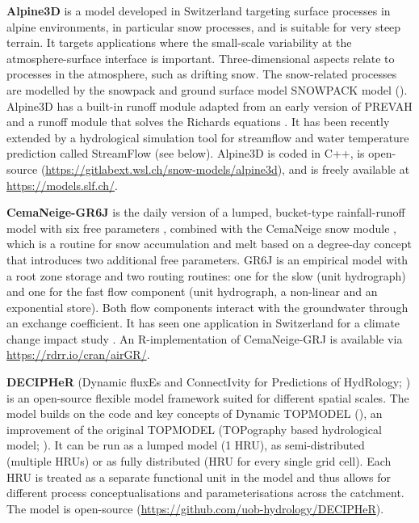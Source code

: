 \documentclass[10pt,a4paper]{article}
\begin{document}
\textbf{Alpine3D} \citep{Lehning2006} is a model developed in Switzerland targeting surface processes in alpine environments, in particular snow processes, and is suitable for very steep terrain. It targets applications where the small-scale variability at the atmosphere-surface interface is important. Three-dimensional aspects relate to processes in the atmosphere, such as drifting snow. The snow-related processes are modelled by the snowpack and ground surface model SNOWPACK model (\citealt{Bartelt2002, Lehning2002a, Lehning2002b}). Alpine3D has a built-in runoff module adapted from an early version of PREVAH \citep{Lehning2006} and a runoff module that solves the Richards equations \citep{Wever2017}. It has been recently extended by a hydrological simulation tool for streamflow and water temperature prediction called StreamFlow (see below). Alpine3D is coded in C++, is open-source (\url{https://gitlabext.wsl.ch/snow-models/alpine3d}), and is freely available at \url{https://models.slf.ch/}.

\textbf{CemaNeige-GR6J} is the daily version of a lumped, bucket-type rainfall-runoff model with six free parameters \citep{Pushpalatha2011}, combined with the CemaNeige snow module \citep{Valery2014a, Valery2014b}, which is a routine for snow accumulation and melt based on a degree-day concept that introduces two additional free parameters. GR6J is an empirical model with a root zone storage and two routing routines: one for the slow (unit hydrograph) and one for the fast flow component ({unit hydrograph}, a non-linear and an exponential store). Both flow components interact with the groundwater through an exchange coefficient. It has seen one application in Switzerland for a climate change impact study \citep{Keller2019a}. An R-implementation of CemaNeige-GRJ is available via \url{https://rdrr.io/cran/airGR/}.

\textbf{DECIPHeR} (Dynamic fluxEs and ConnectIvity for Predictions of HydRology; \citealp{Coxon2019}) is an open-source flexible model framework suited for different spatial scales. The model builds on the code and key concepts of Dynamic TOPMODEL (\citealp{Beven2001}), an improvement of the original TOPMODEL (TOPography based hydrological model; \citealp{Beven1979}). It can be run as a lumped model (1 HRU), as semi-distributed (multiple HRUs) or as fully distributed (HRU for every single grid cell). Each HRU is treated as a separate functional unit in the model and thus allows for different process conceptualisations and parameterisations across the catchment. The model is open-source (\url{https://github.com/uob-hydrology/DECIPHeR}).
\end{document}
